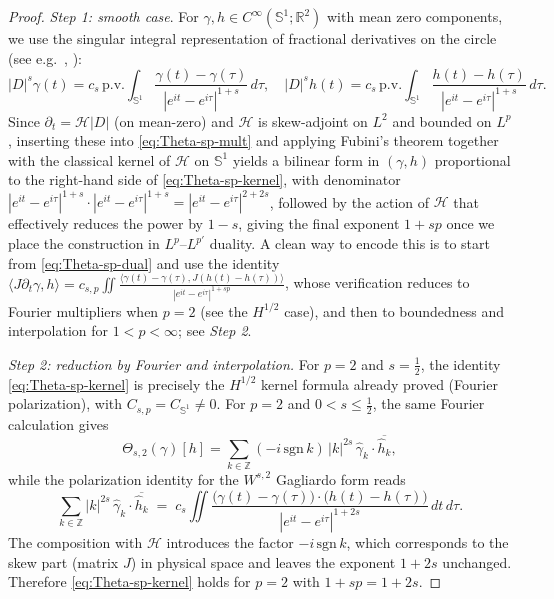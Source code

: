 \documentclass{amsart}
\newcounter{ex}
\newcounter{re}
\begin{document}
\begin{proof}
\emph{Step 1: smooth case}. For $\gamma,h\in C^\infty(\mathbb S^1;\mathbb R^2)$ with mean zero
components, we use the singular integral representation of fractional derivatives
on the circle (see e.g.\ \cite[Th.\,V.5]{SteinSI}, \cite[Th.\,6.3.3]{GrafakosCA}):
\[
|D|^{s}\gamma(t)=c_{s}\,\mathrm{p.v.}\!\int_{\mathbb S^1}
\frac{\gamma(t)-\gamma(\tau)}{|e^{it}-e^{i\tau}|^{1+s}}\,d\tau ,
\quad
|D|^{s}h(t)=c_{s}\,\mathrm{p.v.}\!\int_{\mathbb S^1}
\frac{h(t)-h(\tau)}{|e^{it}-e^{i\tau}|^{1+s}}\,d\tau .
\]
Since $\partial_t=\mathcal H|D|$ (on mean-zero) and $\mathcal H$ is skew-adjoint on $L^2$
and bounded on $L^p$, inserting these into \eqref{eq:Theta-sp-mult} and applying Fubini’s theorem
together with the classical kernel of $\mathcal H$ on $\mathbb S^1$ yields a bilinear form in
$(\gamma,h)$ proportional to the right-hand side of \eqref{eq:Theta-sp-kernel}, with denominator
$|e^{it}-e^{i\tau}|^{1+s}\cdot |e^{it}-e^{i\tau}|^{1+s}=|e^{it}-e^{i\tau}|^{2+2s}$,
followed by the action of $\mathcal H$ that effectively reduces the power by $1-s$,
giving the final exponent $1+sp$ once we place the construction in $L^p$–$L^{p'}$ duality.
A clean way to encode this is to start from \eqref{eq:Theta-sp-dual} and use the identity
$\langle J\partial_t\gamma, h\rangle
= c_{s,p}\iint \frac{\langle \gamma(t)-\gamma(\tau),J(h(t)-h(\tau))\rangle}{|e^{it}-e^{i\tau}|^{1+sp}}$,
whose verification reduces to Fourier multipliers when $p=2$ (see the $H^{1/2}$ case),
and then to boundedness and interpolation for $1<p<\infty$; see \emph{Step 2}.

\emph{Step 2: reduction by Fourier and interpolation.}
For $p=2$ and $s=\tfrac12$, the identity \eqref{eq:Theta-sp-kernel}
is precisely the $H^{1/2}$ kernel formula already proved (Fourier polarization),
with $C_{s,p}=C_{\mathbb S^1}\neq 0$.
For $p=2$ and $0<s\le \tfrac12$, the same Fourier calculation gives
\[
\Theta_{s,2}(\gamma)[h]
=\sum_{k\in\mathbb Z} (-i\,\mathrm{sgn}\,k)\,|k|^{2s}\,\widehat \gamma_k\cdot \overline{\widehat h_k},
\]
while the polarization identity for the $W^{s,2}$ Gagliardo form reads
\[
\sum_{k\in\mathbb Z}|k|^{2s}\,\widehat \gamma_k\cdot \overline{\widehat h_k}
\;=\; c_s\iint \frac{\big(\gamma(t)-\gamma(\tau)\big)\cdot\big(h(t)-h(\tau)\big)}
{|e^{it}-e^{i\tau}|^{1+2s}}\,dt\,d\tau .
\]
The composition with $\mathcal H$ introduces the factor $-i\,\mathrm{sgn}\,k$,
which corresponds to the skew part (matrix $J$) in physical space and leaves the exponent
$1+2s$ unchanged. Therefore \eqref{eq:Theta-sp-kernel} holds for $p=2$ with $1+sp=1+2s$.


\end{proof}
\end{document}
